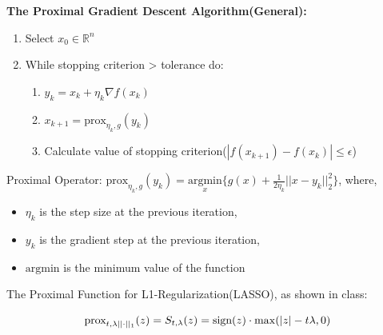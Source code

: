 \documentclass[
  letterpaper,
  DIV=11,
  numbers=noendperiod]{scrartcl}
\providecommand{\tightlist}{%
  \setlength{\itemsep}{0pt}\setlength{\parskip}{0pt}}\usepackage{longtable,booktabs,array}
\begin{document}
\textbf{The Proximal Gradient Descent Algorithm(General):}

\begin{enumerate}
\def\labelenumi{\arabic{enumi}.}
\tightlist
\item
  Select \(x_0 \in \mathbb{R}^n\)
\item
  While stopping criterion \textgreater{} tolerance do:

  \begin{enumerate}
  \def\labelenumii{\arabic{enumii}.}
  \tightlist
  \item
    \(y_k = x_k + \eta_k \nabla{f(x_k)}\)
  \item
    \(x_{k+1} = \text{prox}_{\eta_k,g}(y_k)\)
  \item
    Calculate value of stopping
    criterion(\(|f(x_{k+1}) - f(x_k)| \leq \epsilon\))
  \end{enumerate}
\end{enumerate}

Proximal Operator:
\(\text{prox}_{\eta_k,g}(y_k) = \underset{x}{\text{argmin}}\{ g(x) + \frac{1}{2\eta_k}||x-y_k||^2_2 \}\),
where,

\begin{itemize}
\item
  \(\eta_k\) is the step size at the previous iteration,
\item
  \(y_k\) is the gradient step at the previous iteration,
\item
  \(\text{argmin}\) is the minimum value of the function
\end{itemize}

The Proximal Function for L1-Regularization(LASSO), as shown in class:

\[
\text{prox}_{t,\lambda||\cdot||_1}(z) = S_{t,\lambda}(z) = \text{sign}(z) \cdot \max(|z|-t\lambda,\space0)
\]
\end{document}
